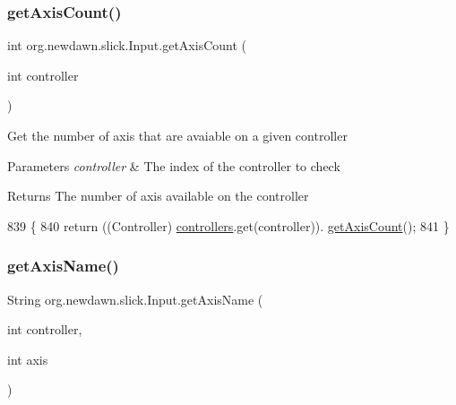 \subsubsection{\texorpdfstring{get\+Axis\+Count()}{getAxisCount()}}
{\footnotesize\ttfamily int org.\+newdawn.\+slick.\+Input.\+get\+Axis\+Count (\begin{DoxyParamCaption}\item[{int}]{controller }\end{DoxyParamCaption})\hspace{0.3cm}{\ttfamily [inline]}}

Get the number of axis that are avaiable on a given controller


\begin{DoxyParams}{Parameters}
{\em controller} & The index of the controller to check \\
\hline
\end{DoxyParams}
\begin{DoxyReturn}{Returns}
The number of axis available on the controller 
\end{DoxyReturn}

\begin{DoxyCode}
839                                             \{
840         \textcolor{keywordflow}{return} ((Controller) \mbox{\hyperlink{classorg_1_1newdawn_1_1slick_1_1_input_a1bcc91bf0db9efc578bd934a8ed9ce67}{controllers}}.get(controller)).
      \mbox{\hyperlink{classorg_1_1newdawn_1_1slick_1_1_input_a9c3dde96ab6a064b02e7eb24fe29cc4a}{getAxisCount}}();
841     \}
\end{DoxyCode}
\mbox{\label{classorg_1_1newdawn_1_1slick_1_1_input_a3840d085b002b57fa88c9fe6268523e9}} 
\subsubsection{\texorpdfstring{get\+Axis\+Name()}{getAxisName()}}
{\footnotesize\ttfamily String org.\+newdawn.\+slick.\+Input.\+get\+Axis\+Name (\begin{DoxyParamCaption}\item[{int}]{controller,  }\item[{int}]{axis }\end{DoxyParamCaption})\hspace{0.3cm}{\ttfamily [inline]}}

